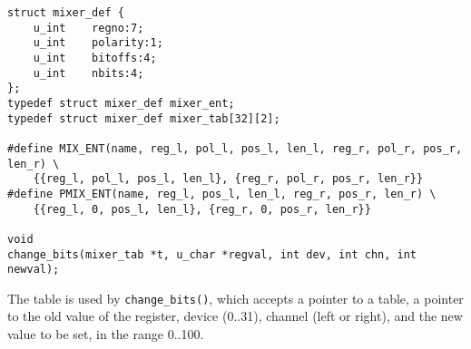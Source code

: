 \documentclass[11pt]{article}
\begin{document}
\begin{verbatim}
struct mixer_def {
    u_int    regno:7;
    u_int    polarity:1;
    u_int    bitoffs:4;
    u_int    nbits:4;
};
typedef struct mixer_def mixer_ent;
typedef struct mixer_def mixer_tab[32][2];

#define MIX_ENT(name, reg_l, pol_l, pos_l, len_l, reg_r, pol_r, pos_r, len_r) \
    {{reg_l, pol_l, pos_l, len_l}, {reg_r, pol_r, pos_r, len_r}}
#define PMIX_ENT(name, reg_l, pos_l, len_l, reg_r, pos_r, len_r) \
    {{reg_l, 0, pos_l, len_l}, {reg_r, 0, pos_r, len_r}}

void
change_bits(mixer_tab *t, u_char *regval, int dev, int chn, int newval);
\end{verbatim}
The table is used by {\tt change\_bits()}, which accepts a pointer
to a table, a pointer to the old value of the register, device
(0..31), channel (left or right), and the new value to be set, in
the range 0..100.
\end{document}
